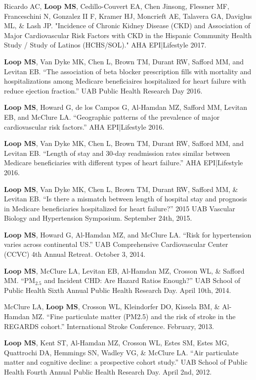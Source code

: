 \documentclass[10pt,letterpaper]{article}
\renewenvironment{itemize}{
  \begin{list}{}{
    \setlength{\leftmargin}{1.5em}
    \setlength{\itemsep}{0.25em}
    \setlength{\parskip}{0pt}
    \setlength{\parsep}{0.25em}
  }
}{
  \end{list}
}
\begin{document}
\begin{itemize}
    \item Ricardo AC, \textbf{Loop MS}, Cedillo-Couvert EA, Chen Jinsong, Flessner MF, Franceschini N, Gonzalez II F, Kramer HJ, Moncrieft AE, Talavera GA, Daviglus ML, \& Lash JP. "Incidence of Chronic Kidney Disease (CKD) and Association of Major Cardiovascular Risk Factors with CKD in the Hispanic Community Health Study / Study of Latinos (HCHS/SOL)." AHA EPI|Lifestyle 2017.
	\item \textbf{Loop MS}, Van Dyke MK, Chen L, Brown TM, Durant RW, Safford MM, and Levitan EB. ``The association of beta blocker prescription fills with mortality and hospitalizations among Medicare beneficiaires hospitalized for heart failure with reduce ejection fraction.'' UAB Public Health Research Day 2016.
	\item \textbf{Loop MS}, Howard G, de los Campos G, Al-Hamdan MZ, Safford MM, Levitan EB, and McClure LA. ``Geographic patterns of the prevalence of major cardiovascular risk factors.'' AHA EPI|Lifestyle 2016.
	\item \textbf{Loop MS}, Van Dyke MK, Chen L, Brown TM, Durant RW, Safford MM, and Levitan EB. ``Length of stay and 30-day readmission rates similar between Medicare beneficiaries with different types of heart failure.'' AHA EPI|Lifestyle 2016.
	\item \textbf{Loop MS}, Van Dyke MK, Chen L, Brown TM, Durant RW, Safford MM, \& Levitan EB. ``Is there a mismatch between length of hospital stay and prognosis in Medicare beneficiaries hospitalized for heart failure?'' 2015 UAB Vascular Biology and Hypertension Symposium. September 24th, 2015.
	\item \textbf{Loop MS}, Howard G, Al-Hamdan MZ, and McClure LA. “Risk for hypertension varies across continental US.” UAB Comprehensive Cardiovascular Center (CCVC) 4th Annual Retreat. October 3, 2014.
	\item \textbf{Loop MS}, McClure LA, Levitan EB, Al-Hamdan MZ, Crosson WL, \& Safford MM. ``PM$_{2.5}$ and Incident CHD: Are Hazard Ratios Enough?'' UAB School of Public Health Sixth Annual Public Health Research Day. April 10th, 2014.
	\item McClure LA, \textbf{Loop MS}, Crosson WL, Kleindorfer DO, Kissela BM, \& Al-Hamdan MZ. ``Fine particulate matter (PM2.5) and the risk of stroke in the REGARDS cohort.'' International Stroke Conference. February, 2013. 
	\item \textbf{Loop MS}, Kent ST, Al-Hamdan MZ, Crosson WL, Estes SM, Estes MG, Quattrochi DA, Hemmings SN, Wadley VG, \& McClure LA. ``Air particulate matter and cognitive decline: a prospective cohort study.'' UAB School of Public Health Fourth Annual Public Health Research Day. April 2nd, 2012.

\end{itemize}
\end{document}
